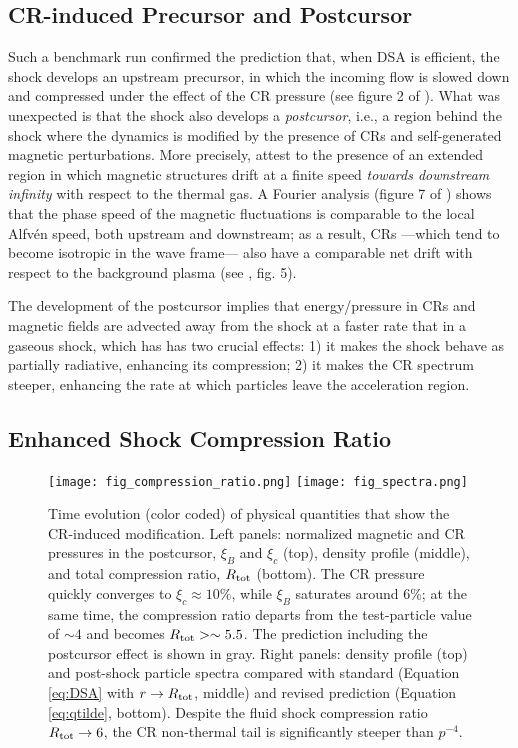 \documentclass[varenna]{cimento}
\newcommand{\rt}{R_{\rm tot}}
\begin{document}
\subsection{CR-induced Precursor and Postcursor}

Such a benchmark run confirmed the prediction that, when DSA is efficient, the shock develops an upstream precursor, in which the incoming flow is slowed down and compressed under the effect of the CR pressure (see figure 2 of \cite{haggerty+20}).
What was unexpected is that the shock also develops a \emph{postcursor}, i.e., a region behind the shock where the dynamics is modified by the presence of CRs and self-generated magnetic perturbations. 
More precisely, \cite{haggerty+20} attest to the presence of an extended region in which magnetic structures drift at a finite speed \emph{towards downstream infinity} with respect to the thermal gas.
A Fourier analysis (figure 7 of \cite{haggerty+20}) shows that the phase speed of the magnetic fluctuations is comparable to the local Alfv\'en speed, both upstream and downstream;
as a result, CRs ---which tend to become isotropic in the wave frame---  also have a comparable net drift with respect to the background plasma (see \cite{haggerty+20}, fig. 5). 

The development of the postcursor implies that energy/pressure in CRs and magnetic fields are advected away from the shock at a faster rate that in a gaseous shock, which has has two crucial effects: 
1) it makes the shock behave as partially radiative, enhancing its compression;
2) it makes the CR spectrum steeper, enhancing the rate at which particles leave the acceleration region.

\subsection{Enhanced Shock Compression Ratio}
\begin{figure}[t]
\texttt{[image: fig\_compression\_ratio.png]}
\texttt{[image: fig\_spectra.png]}
\caption{
Time evolution (color coded) of physical quantities that show the CR-induced modification.
Left panels: normalized magnetic and CR pressures in the postcursor, $\xi_B$ and $\xi_c$  (top), density profile (middle), and total compression ratio, $\rt$ (bottom).
The CR pressure quickly converges to $\xi_c\approx 10\%$, while $\xi_B$ saturates around 6\%;
at the same time, the compression ratio departs from the test-particle value of $\sim 4$ and becomes $\rt>\sim 5.5$.
The prediction including the postcursor effect \cite{haggerty+20} is shown in gray.
Right panels: density profile (top) and post-shock particle spectra compared with standard (Equation \ref{eq:DSA} with $r\to\rt$, middle) and revised prediction (Equation \ref{eq:qtilde}, bottom).
Despite the fluid shock compression ratio $\rt\to 6$, the CR non-thermal tail is significantly steeper than $p^{-4}$.}\label{fig:R}
\vspace{-0.5cm}
\end{figure}
\end{document}
